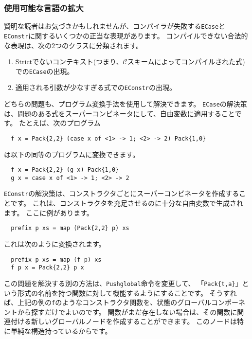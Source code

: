 \documentclass{jarticle}
\begin{document}
\subsubsection{使用可能な言語の拡大}

賢明な読者はお気づきかもしれませんが、コンパイラが失敗する\texttt{ECase}と\texttt{EConstr}に関するいくつかの正当な表現があります。
コンパイルできない合法的な表現は、次の2つのクラスに分類されます。

\begin{enumerate}
	\item Strictでないコンテキスト(つまり、$\mathcal{C}$スキームによってコンパイルされた式)での\texttt{ECase}の出現。
	\item 適用される引数が少なすぎる式での\texttt{EConstr}の出現。
\end{enumerate}

どちらの問題も、プログラム変換手法を使用して解決できます。
\texttt{ECase}の解決策は、問題のある式をスーパーコンビネータにして、自由変数に適用することです。
たとえば、次のプログラム

\begin{verbatim}
  f x = Pack{2,2} (case x of <1> -> 1; <2> -> 2) Pack{1,0}
\end{verbatim}

は以下の同等のプログラムに変換できます。

\begin{verbatim}
  f x = Pack{2,2} (g x) Pack{1,0}
  g x = case x of <1> -> 1; <2> -> 2
\end{verbatim}

\texttt{EConstr}の解決策は、コンストラクタごとにスーパーコンビネータを作成することです。
これは、コンストラクタを充足させるのに十分な自由変数で生成されます。
ここに例があります。

\begin{verbatim}
  prefix p xs = map (Pack{2,2} p) xs
\end{verbatim}

これは次のように変換されます。

\begin{verbatim}
  prefix p xs = map (f p) xs
  f p x = Pack{2,2} p x
\end{verbatim}

この問題を解決する別の方法は、\texttt{Pushglobal}命令を変更して、
「\texttt{Pack\{t,a\}}」という形式の名前を持つ関数に対して機能するようにすることです。
そうすれば、上記の例の\texttt{f}のようなコンストラクタ関数を、状態のグローバルコンポーネントから探すだけでよいのです。
関数がまだ存在しない場合は、その関数に関連付ける新しいグローバルノードを作成することができます。
このノードは特に単純な構造持っているからです。
\end{document}
